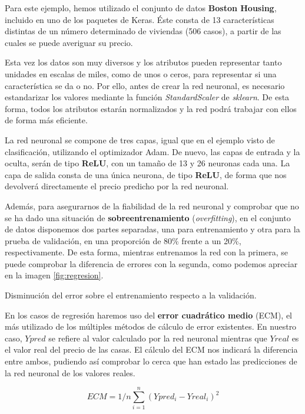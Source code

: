 Para este ejemplo, hemos utilizado el conjunto de datos \textbf{Boston Housing}, incluido en uno de los paquetes de Keras. Éste consta de 13 características distintas de un número determinado de viviendas (506 casos), a partir de las cuales se puede averiguar su precio. 

Esta vez los datos son muy diversos y los atributos pueden representar tanto unidades en escalas de miles, como de unos o ceros, para representar si una característica se da o no. Por ello, antes de crear la red neuronal, es necesario estandarizar los valores mediante la función \textit{StandardScaler} de \textit{sklearn}. De esta forma, todos los atributos estarán normalizados y la red podrá trabajar con ellos de forma más eficiente.

La red neuronal se compone de tres capas, igual que en el ejemplo visto de clasificación, utilizando el optimizador Adam. De nuevo, las capas de entrada y la oculta, serán de tipo \textbf{ReLU}, con un tamaño de 13 y 26 neuronas cada una. La capa de salida consta de una única neurona, de tipo \textbf{ReLU}, de forma que nos devolverá directamente el precio predicho por la red neuronal. 

Además, para asegurarnos de la fiabilidad de la red neuronal y comprobar que no se ha dado una situación de \textbf{sobreentrenamiento} (\textit{overfitting}), en el conjunto de datos disponemos dos partes separadas, una para entrenamiento y otra para la prueba de validación, en una proporción de 80\% frente a un 20\%, respectivamente. De esta forma, mientras entrenamos la red con la primera, se puede comprobar la diferencia de errores con la segunda, como podemos apreciar en la imagen \ref{fig:regresion}.

%
       {Disminución del error sobre el entrenamiento respecto a la validación.} 

En los casos de regresión haremos uso del \textbf{error cuadrático medio} (ECM), el más utilizado de los múltiples métodos de cálculo de error existentes. En nuestro caso, $Ypred$ se refiere al valor calculado por la red neuronal mientras que $Yreal$ es el valor real del precio de las casas. El cálculo del ECM nos indicará la diferencia entre ambos, pudiendo así comprobar lo cerca que han estado las predicciones de la red neuronal de los valores reales.

$$ECM = 1/n \sum^n_{i=1}(Ypred_i - Yreal_i)^2$$

